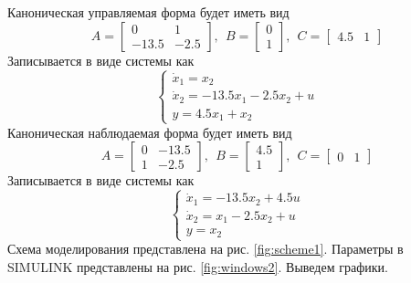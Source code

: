 \documentclass[a4paper, 12pt]{article}
\begin{document}
    Каноническая управляемая форма будет иметь вид
    $$
    A=
    \begin{bmatrix}
        0 & 1\\
        -13.5 & -2.5
    \end{bmatrix},\ \
    B=
    \begin{bmatrix}
        0\\
        1
    \end{bmatrix},\ \
    C=
    \begin{bmatrix}
        4.5 & 1
    \end{bmatrix}
    $$
    Записывается в виде системы как
    $$
    \begin{cases}
        \dot{x}_1=x_2\\
        \dot{x}_2=-13.5x_1-2.5x_2+u\\
        y=4.5x_1+x_2
    \end{cases}
    $$
    Каноническая наблюдаемая форма будет иметь вид
    $$
    A=
    \begin{bmatrix}
        0 & -13.5\\
        1 & -2.5
    \end{bmatrix},\ \
    B=
    \begin{bmatrix}
        4.5\\
        1
    \end{bmatrix},\ \
    C=
    \begin{bmatrix}
        0 & 1
    \end{bmatrix}
    $$
    Записывается в виде системы как
    $$
    \begin{cases}
        \dot{x}_1=-13.5x_2+4.5u\\
        \dot{x}_2=x_1-2.5x_2+u\\
        y=x_2
    \end{cases}
    $$
    Схема моделирования представлена на рис. \ref{fig:scheme1}. Параметры в SIMULINK представлены на рис. \ref{fig:windows2}. Выведем графики.
\end{document}
